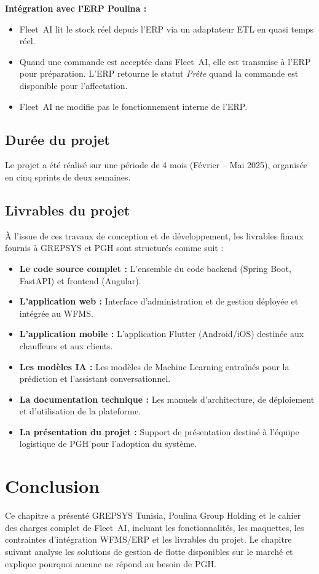 \textbf{Intégration avec l'ERP Poulina :}
\begin{itemize}[leftmargin=2.5em]
    \item[$\bullet$] Fleet~AI lit le stock réel depuis l'ERP via un adaptateur ETL en quasi temps réel.
    \item[$\bullet$] Quand une commande est acceptée dans Fleet~AI, elle est transmise à l'ERP pour préparation. L'ERP retourne le statut \textit{Prête} quand la commande est disponible pour l'affectation.
    \item[$\bullet$] Fleet~AI ne modifie pas le fonctionnement interne de l'ERP.
\end{itemize}

\subsection{Durée du projet}

Le projet a été réalisé sur une période de 4 mois (Février -- Mai 2025), organisée en cinq sprints de deux semaines.

\subsection{Livrables du projet}

À l'issue de ces travaux de conception et de développement, les livrables finaux fournis à GREPSYS et PGH sont structurés comme suit :
\begin{itemize}[leftmargin=2.5em]
    \item[$\bullet$] \textbf{Le code source complet :} L'ensemble du code backend (Spring Boot, FastAPI) et frontend (Angular).
    \item[$\bullet$] \textbf{L'application web :} Interface d'administration et de gestion déployée et intégrée au WFMS.
    \item[$\bullet$] \textbf{L'application mobile :} L'application Flutter (Android/iOS) destinée aux chauffeurs et aux clients.
    \item[$\bullet$] \textbf{Les modèles IA :} Les modèles de Machine Learning entraînés pour la prédiction et l'assistant conversationnel.
    \item[$\bullet$] \textbf{La documentation technique :} Les manuels d'architecture, de déploiement et d'utilisation de la plateforme.
    \item[$\bullet$] \textbf{La présentation du projet :} Support de présentation destiné à l'équipe logistique de PGH pour l'adoption du système.
\end{itemize}

\section*{Conclusion}
Ce chapitre a présenté GREPSYS Tunisia, Poulina Group Holding et le cahier des charges complet de Fleet~AI, incluant les fonctionnalités, les maquettes, les contraintes d'intégration WFMS/ERP et les livrables du projet. Le chapitre suivant analyse les solutions de gestion de flotte disponibles sur le marché et explique pourquoi aucune ne répond au besoin de PGH.
